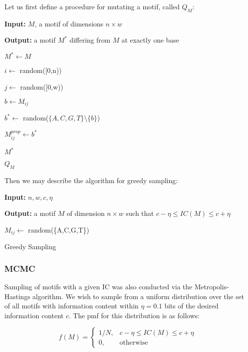 \documentclass{article}
\renewcommand{\KwData}{\textbf{Input: }}
\renewcommand{\KwResult}{\textbf{Output: }}
\begin{document}
Let us first define a procedure for mutating a motif, called $Q_M$:

\begin{algorithm}[H]
  \SetLine
  \KwData{$M$, a motif of dimensions $n\times w$}
  
  \KwResult{a motif $M^*$ differing from $M$ at exactly one base}
  
  $M^{*} \leftarrow M$

   $i\leftarrow$ random([0,n))

   $j\leftarrow$ random([0,w))
   
   $b\leftarrow M_{ij}$

   $b^*\leftarrow$ random($\{A,C,G,T\}\setminus\{b\}$)

   $M^{prop}_{ij} \leftarrow b^*$ 

   \Return $M^*$

   \caption{$Q_M$}
   \label{alg:mutate_motif}
\end{algorithm}

Then we may describe the algorithm for greedy sampling:

\begin{algorithm}[H]
 \SetLine
 \KwData{$n,w,c,\eta$}

 \KwResult{a motif $M$ of dimension $n\times w$ such that $c - \eta \leq IC(M)\leq c + \eta$}

 \For{$i \in [0,n)$}
 {\For{$j \in [0,w)$}
   {$M_{ij}\leftarrow$ random(\{A,C,G,T\})}
 }
 
 \caption{Greedy Sampling}
 \label{alg:greedy}
\end{algorithm}

\subsubsection{MCMC}

Sampling of motifs with a given IC was also conducted via the
Metropolis-Hastings algorithm.  We wish to sample from a uniform
distribution over the set of all motifs with information content
within $\eta = 0.1$ bits of the desired information content $c$.  The
pmf for this distribution is as follows:

\begin{equation}
  \label{eq:uniform}
  f(M) =  \begin{cases}
    1/N, & c - \eta \leq IC(M) \leq c + \eta\\
    0, & \mathrm{otherwise}
  \end{cases}
\end{equation}
\end{document}
